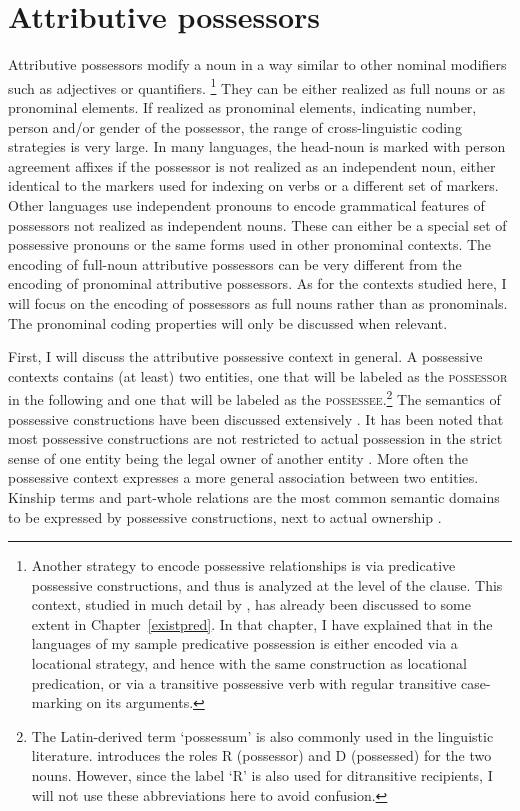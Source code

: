 \section{Attributive possessors}\label{AttrPoss}	

Attributive possessors modify a noun in a way similar to other nominal modifiers such as adjectives or quantifiers.
\footnote{Another strategy to encode possessive relationships is via predicative possessive constructions, and thus is analyzed at the level of the clause. 
This context, studied in much detail by \citet{Stassen:2009}, has already been discussed to some extent in Chapter~\ref{existpred}. 
In that chapter, I have explained that in the languages of my sample predicative possession is either encoded via a locational strategy, and hence with the same construction as locational predication, or via a transitive possessive verb with regular transitive case-marking on its arguments.}
They can be either realized as full nouns or as pronominal elements. 
If realized as pronominal elements, indicating number, person and/or gender of the possessor, the range of cross-linguistic coding strategies is very large. 
In many languages, the head-noun is marked with person agreement affixes if the possessor is not realized as an independent noun, either identical to the markers used for indexing on verbs or a different set of markers. 
Other languages use independent pronouns to encode grammatical features of possessors not realized as independent nouns. 
These can either be a special set of possessive pronouns or the same forms used in other pronominal contexts. 
The encoding of full-noun attributive possessors can be very different from the encoding of pronominal attributive possessors. 
As for the contexts studied here, I will focus on the encoding of possessors as full nouns rather than as pronominals. 
The pronominal coding properties will only be discussed when relevant. 
  
First, I will discuss the attributive possessive context in general.
A possessive contexts contains (at least) two entities, one that will be labeled as the \textsc{possessor} in the following and one that will be labeled as the \textsc{possessee}.\footnote{The Latin-derived term `possessum' is also commonly used in the linguistic literature. 
\citet[262]{Dixon:2010-2} introduces the roles R (possessor) and D (possessed) for the two nouns. 
However, since the label `R' is also used for ditransitive recipients, I will not use these abbreviations here to avoid confusion.}
The semantics of possessive constructions have been discussed extensively \citep[143--156]{Heine:1997}. 
It has been noted that most possessive constructions are not restricted to actual possession in the strict sense of one entity being the legal owner of another entity \citep[722]{Lyons:1977}. More often the possessive context expresses a more general association between two entities. 
Kinship terms and part-whole relations are the most common semantic domains to be expressed by possessive constructions, next to actual ownership \citep[263]{Dixon:2010-2}.

